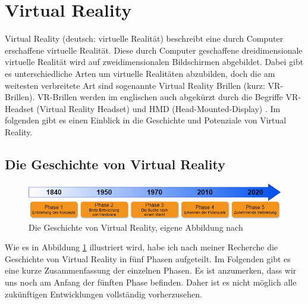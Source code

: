 \section{Virtual Reality}\label{sec:VR}
Virtual Reality (deutsch: virtuelle Realität) beschreibt eine durch Computer erschaffene virtuelle Realität. Diese durch Computer geschaffene dreidimensionale virtuelle Realität wird auf zweidimensionalen Bildschirmen abgebildet. Dabei gibt es unterschiedliche Arten um virtuelle Realitäten abzubilden, doch die am weitesten verbreitete Art sind sogenannte Virtual Reality Brillen (kurz: VR-Brillen). VR-Brillen werden im englischen auch abgekürzt durch die Begriffe VR-Headset (Virtual Reality Headset) und HMD (Head-Mounted-Display) \cite{19}. Im folgenden gibt es einen Einblick in die Geschichte und Potenziale von Virtual Reality.

\subsection{Die Geschichte von Virtual Reality}\label{sec:VRGeschichte}
\begin{figure}[h]
	\centering
	\includegraphics[width=1\linewidth]{Bilder/A12_GeschichteVR}
	\caption{Die Geschichte von Virtual Reality, eigene Abbildung nach \cite{20,21,22,23}}
	\label{fig:GeschichteVR}
\end{figure}
\noindent Wie es in Abbildung \ref{fig:GeschichteVR} illustriert wird, habe ich nach meiner Recherche die Geschichte von Virtual Reality in fünf Phasen aufgeteilt. Im Folgenden gibt es eine kurze Zusammenfassung der einzelnen Phasen. Es ist anzumerken, dass wir uns noch am Anfang der fünften Phase befinden. Daher ist es nicht möglich alle zukünftigen Entwicklungen vollständig vorherzusehen.

